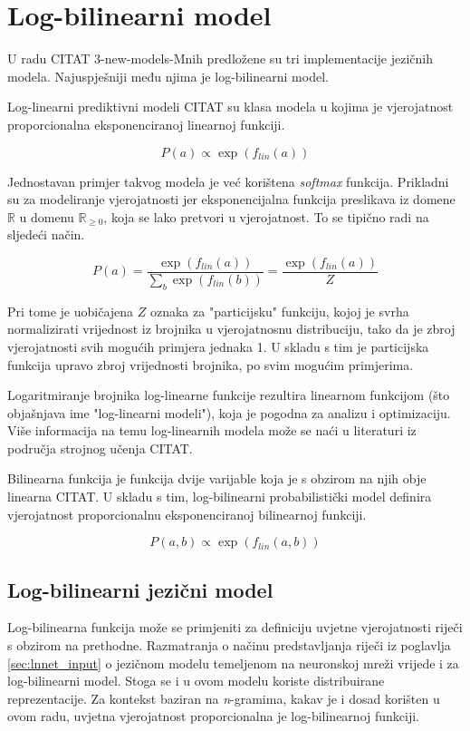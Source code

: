 \documentclass[times, utf8, diplomski, numeric]{fer}
\begin{document}
\chapter{Log-bilinearni model}

U radu CITAT 3-new-models-Mnih predložene su tri implementacije jezičnih modela. Najuspješniji među njima je log-bilinearni model.

Log-linearni prediktivni modeli CITAT su klasa modela u kojima je vjerojatnost proporcionalna eksponenciranoj linearnoj funkciji.

\[
P(a) \propto \exp(f_{lin}(a))
\]

 Jednostavan primjer takvog modela je već korištena \textit{softmax} funkcija. Prikladni su za modeliranje vjerojatnosti jer eksponencijalna funkcija preslikava iz domene $\mathbb{R}$ u domenu $\mathbb{R}_{\geq 0}$, koja se lako pretvori u vjerojatnost. To se tipično radi na sljedeći način.

\[
P(a) = \frac{\exp(f_{lin}(a))}{ \sum_b \exp(f_{lin}(b))} = \frac{\exp(f_{lin}(a))}{Z}
\]

Pri tome je uobičajena $Z$ oznaka za "particijsku" funkciju, kojoj je svrha normalizirati vrijednost iz brojnika u vjerojatnosnu distribuciju, tako da je zbroj vjerojatnosti svih mogućih primjera jednaka 1. U skladu s tim je particijska funkcija upravo zbroj vrijednosti brojnika, po svim mogućim primjerima.

 Logaritmiranje brojnika log-linearne funkcije rezultira linearnom funkcijom (što objašnjava ime "log-linearni modeli"), koja je pogodna za analizu i optimizaciju. Više informacija na temu log-linearnih modela može se naći u literaturi iz područja strojnog učenja CITAT.

Bilinearna funkcija je funkcija dvije varijable koja je s obzirom na njih obje linearna CITAT. U skladu s tim, log-bilinearni probabilistički model definira vjerojatnost proporcionalnu eksponenciranoj bilinearnoj funkciji.

\[
P(a, b) \propto \exp(f_{lin}(a, b))
\]

\section{Log-bilinearni jezični model}

Log-bilinearna funkcija može se primjeniti za definiciju uvjetne vjerojatnosti riječi s obzirom na prethodne. Razmatranja o načinu predstavljanja riječi iz poglavlja \ref{sec:lnnet_input} o jezičnom modelu temeljenom na neuronskoj mreži vrijede i za log-bilinearni model. Stoga se i u ovom modelu koriste distribuirane reprezentacije. Za kontekst baziran na \textit{n}-gramima, kakav je i dosad korišten u ovom radu, uvjetna vjerojatnost proporcionalna je log-bilinearnoj funkciji.
\end{document}
